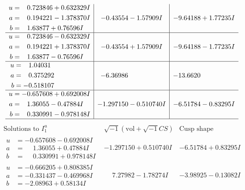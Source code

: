 \documentclass[1p]{elsarticle_modified}
\theoremstyle{definition}
\newcommand{\I}{\sqrt{-1}}
\begin{document}
$$\begin{array}{c|c|c}
\begin{aligned}
u &= \phantom{-}0.723846 + 0.632329 I \\
a &= \phantom{-}0.194221 - 1.378370 I \\
b &= \phantom{-}1.63877 + 0.76596 I\end{aligned}
 & -0.43554 - 1.57909 I & -9.64188 + 1.77235 I \\ \hline\begin{aligned}
u &= \phantom{-}0.723846 - 0.632329 I \\
a &= \phantom{-}0.194221 + 1.378370 I \\
b &= \phantom{-}1.63877 - 0.76596 I\end{aligned}
 & -0.43554 + 1.57909 I & -9.64188 - 1.77235 I \\ \hline\begin{aligned}
u &= \phantom{-}1.04031\phantom{ +0.000000I} \\
a &= \phantom{-}0.375292\phantom{ +0.000000I} \\
b &= -0.518107\phantom{ +0.000000I}\end{aligned}
 & -6.36986\phantom{ +0.000000I} & -13.6620\phantom{ +0.000000I} \\ \hline\begin{aligned}
u &= -0.657608 + 0.692008 I \\
a &= \phantom{-}1.36055 - 0.47884 I \\
b &= \phantom{-}0.330991 - 0.978148 I\end{aligned}
 & -1.297150 - 0.510740 I & -6.51784 - 0.83295 I\\
 \hline 
 \end{array}$$\newpage$$\begin{array}{c|c|c}  
\text{Solutions to }I^u_{1}& \I (\text{vol} + \sqrt{-1}CS) & \text{Cusp shape}\\
 \hline 
\begin{aligned}
u &= -0.657608 - 0.692008 I \\
a &= \phantom{-}1.36055 + 0.47884 I \\
b &= \phantom{-}0.330991 + 0.978148 I\end{aligned}
 & -1.297150 + 0.510740 I & -6.51784 + 0.83295 I \\ \hline\begin{aligned}
u &= -0.666205 + 0.808385 I \\
a &= -0.331437 - 0.469968 I \\
b &= -2.08963 + 0.58134 I\end{aligned}
 & \phantom{-}7.27982 - 1.78274 I & -3.98925 - 0.13082 I \\ \hline\begin{aligned}

\end{aligned}
\end{array}$$
\end{document}
